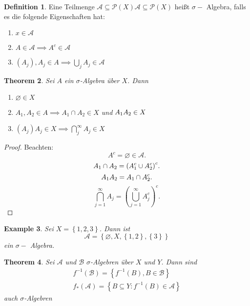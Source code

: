 \documentclass[prb,12pt]{revtex4-2}
\newtheorem{Theorem}{Theorem}
\newtheorem{Example}[Theorem]{Example}
\theoremstyle{definition}
\theoremstyle{definition}
\newtheorem{Definition}[Theorem]{Definition}
\begin{document}
\begin{Definition}
	Eine Teilmenge $\mathcal{A}\subseteq \mathcal{P}(X) \mathcal{A}\subseteq \mathcal{P}(X)$ heißt $\sigma-$ Algebra, falls es die folgende Eigenschaften hat:
	\begin{enumerate}
		\item $x\in \mathcal{A}$ 
		\item $A\in \mathcal{A}\implies A^c\in\mathcal{A}$
		\item $(A_j), A_j\in A\implies \bigcup_{j} A_j\in \mathcal{A}$
	\end{enumerate}
\end{Definition}

\begin{Theorem}
	Sei $A$ ein $\sigma$-Algebra \"{u}ber $X$. Dann
	\begin{enumerate}
		\item $\varnothing \in X$ 
		\item $A_1,A_2\in A\implies A_1\cap A_2\in X$ und $A_1 \\ A_2\in X$ 
		\item $(A_j) A_j\in X\implies \bigcap_{j}^\infty A_j\in X$
	\end{enumerate}
\end{Theorem}

\begin{proof}
	Beachten:
	\[
		A^c=\varnothing\in \mathcal{A}
	.\] 
	\[
	A_1\cap A_2=\qty(A_1^c\cup A_2^c)^c
	.\] 
	\[
	A_1 \\ A_2=A_1\cap A_2^c
	.\] 
	\[
	\bigcap_{j=1}^\infty A_j=\left( \bigcup_{j=1}^\infty A_j^c \right)^c
	.\] 
\end{proof}

\begin{Example}
	Sei $X=\left\{ 1,2,3 \right\} $. Dann ist
	\[
		\mathcal{A}=\left\{ \varnothing, X, \left\{ 1,2 \right\} , \left\{ 3 \right\}  \right\} \] 
		ein $\sigma-$ Algebra.
\end{Example}

\begin{Theorem}
	Sei $\mathcal{A}$ und $\mathcal{B}$ $\sigma$-Algebren \"{u}ber $X$ und $Y$. Dann sind
	\begin{gather*}
		f^{-1}(\mathcal{B})=\left\{ f^{-1}(B), B\in\mathcal{B} \right\} \\
		f_*(\mathcal{A})=\left\{ B\subseteq Y: f^{-1}(B)\in \mathcal{A} \right\} 
	\end{gather*}
	auch $\sigma$-Algebren
\end{Theorem}
\end{document}
